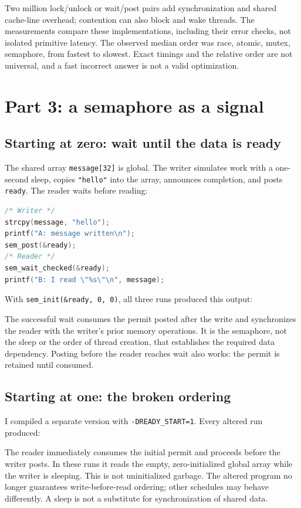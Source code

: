 \documentclass[12pt]{article}
\begin{document}
Two million lock/unlock or wait/post pairs add synchronization and shared
cache-line overhead; contention can also block and wake threads. The
measurements compare these implementations, including their error checks,
not isolated primitive latency. The observed median order was race,
atomic, mutex, semaphore, from fastest to slowest. Exact timings and the
relative order are not universal, and a fast incorrect answer is not a
valid optimization.

\clearpage
\section{Part 3: a semaphore as a signal}
\subsection{Starting at zero: wait until the data is ready}
The shared array \texttt{message[32]} is global. The writer simulates work
with a one-second sleep, copies \texttt{"hello"} into the array, announces
completion, and posts \texttt{ready}. The reader waits before reading:
\begin{lstlisting}[language=C]
/* Writer */
strcpy(message, "hello");
printf("A: message written\n");
sem_post(&ready);
/* Reader */
sem_wait_checked(&ready);
printf("B: I read \"%s\"\n", message);
\end{lstlisting}
With \texttt{sem\_init(\&ready, 0, 0)}, all three runs produced this output:

The successful wait consumes the permit posted after the write and
synchronizes the reader with the writer's prior memory operations. It is
the semaphore, not the sleep or the order of thread creation, that
establishes the required data dependency. Posting before the reader reaches
wait also works: the permit is retained until consumed.

\subsection{Starting at one: the broken ordering}
I compiled a separate version with \texttt{-DREADY\_START=1}. Every altered
run produced:

The reader immediately consumes the initial permit and proceeds before the
writer posts. In these runs it reads the empty, zero-initialized global
array while the writer is sleeping. This is not uninitialized garbage.
The altered program no longer guarantees write-before-read ordering;
other schedules may behave differently. A sleep is not a substitute for
synchronization of shared data.
\end{document}

